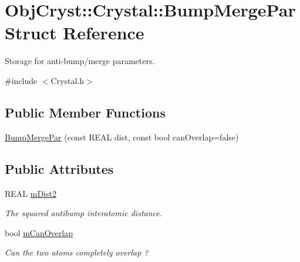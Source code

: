 \hypertarget{struct_obj_cryst_1_1_crystal_1_1_bump_merge_par}{}\section{Obj\+Cryst\+::Crystal\+::Bump\+Merge\+Par Struct Reference}
\label{struct_obj_cryst_1_1_crystal_1_1_bump_merge_par}


Storage for anti-\/bump/merge parameters.  




{\ttfamily \#include $<$Crystal.\+h$>$}

\subsection*{Public Member Functions}
\begin{DoxyCompactItemize}
\item 
\mbox{\hyperlink{struct_obj_cryst_1_1_crystal_1_1_bump_merge_par_ac4da8697127de078e7ef7092c49de0ab}{Bump\+Merge\+Par}} (const R\+E\+AL dist, const bool can\+Overlap=false)
\end{DoxyCompactItemize}
\subsection*{Public Attributes}
\begin{DoxyCompactItemize}
\item 
\mbox{\label{struct_obj_cryst_1_1_crystal_1_1_bump_merge_par_ae8bcf4fc5d270caaa7cd48026489d11d}} 
R\+E\+AL \mbox{\hyperlink{struct_obj_cryst_1_1_crystal_1_1_bump_merge_par_ae8bcf4fc5d270caaa7cd48026489d11d}{m\+Dist2}}
\begin{DoxyCompactList}\small\item\em The squared antibump interatomic distance. \end{DoxyCompactList}\item 
\mbox{\label{struct_obj_cryst_1_1_crystal_1_1_bump_merge_par_acd7b70bc57775c4fc8b33b520f82b98c}} 
bool \mbox{\hyperlink{struct_obj_cryst_1_1_crystal_1_1_bump_merge_par_acd7b70bc57775c4fc8b33b520f82b98c}{m\+Can\+Overlap}}
\begin{DoxyCompactList}\small\item\em Can the two atoms completely overlap ? \end{DoxyCompactList}\end{DoxyCompactItemize}


